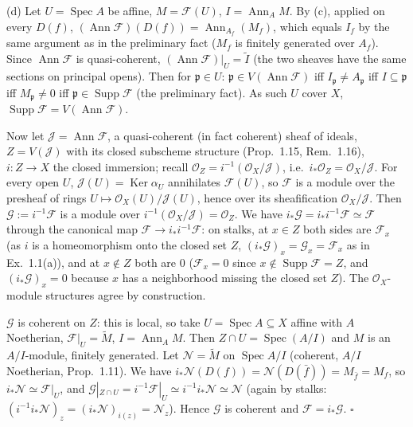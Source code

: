 \documentclass[11pt]{article}
\begin{document}
(d) Let $U=\operatorname{Spec}A$ be affine, $M=\mathcal{F}(U)$, $I=\operatorname{Ann}_AM$. By (c), applied on every $D(f)$, $(\operatorname{Ann}\mathcal{F})(D(f))=\operatorname{Ann}_{A_f}(M_f)$, which equals $I_f$ by the same argument as in the preliminary fact ($M_f$ is finitely generated over $A_f$). Since $\operatorname{Ann}\mathcal{F}$ is quasi-coherent, $(\operatorname{Ann}\mathcal{F})|_U=\widetilde I$ (the two sheaves have the same sections on principal opens). Then for $\mathfrak{p}\in U$: $\mathfrak{p}\in V(\operatorname{Ann}\mathcal{F})$ iff $I_\mathfrak{p}\neq A_\mathfrak{p}$ iff $I\subseteq\mathfrak{p}$ iff $M_\mathfrak{p}\neq0$ iff $\mathfrak{p}\in\operatorname{Supp}\mathcal{F}$ (the preliminary fact). As such $U$ cover $X$, $\operatorname{Supp}\mathcal{F}=V(\operatorname{Ann}\mathcal{F})$.

Now let $\mathcal{J}=\operatorname{Ann}\mathcal{F}$, a quasi-coherent (in fact coherent) sheaf of ideals, $Z=V(\mathcal{J})$ with its closed subscheme structure (Prop.~1.15, Rem.~1.16), $i:Z\to X$ the closed immersion; recall $\mathcal{O}_Z=i^{-1}(\mathcal{O}_X/\mathcal{J})$, i.e.\ $i_*\mathcal{O}_Z=\mathcal{O}_X/\mathcal{J}$. For every open $U$, $\mathcal{J}(U)=\operatorname{Ker}\alpha_U$ annihilates $\mathcal{F}(U)$, so $\mathcal{F}$ is a module over the presheaf of rings $U\mapsto\mathcal{O}_X(U)/\mathcal{J}(U)$, hence over its sheafification $\mathcal{O}_X/\mathcal{J}$. Then $\mathcal{G}:=i^{-1}\mathcal{F}$ is a module over $i^{-1}(\mathcal{O}_X/\mathcal{J})=\mathcal{O}_Z$. We have $i_*\mathcal{G}=i_*i^{-1}\mathcal{F}\simeq\mathcal{F}$ through the canonical map $\mathcal{F}\to i_*i^{-1}\mathcal{F}$: on stalks, at $x\in Z$ both sides are $\mathcal{F}_x$ (as $i$ is a homeomorphism onto the closed set $Z$, $(i_*\mathcal{G})_x=\mathcal{G}_x=\mathcal{F}_x$ as in Ex.~1.1(a)), and at $x\notin Z$ both are $0$ ($\mathcal{F}_x=0$ since $x\notin\operatorname{Supp}\mathcal{F}=Z$, and $(i_*\mathcal{G})_x=0$ because $x$ has a neighborhood missing the closed set $Z$). The $\mathcal{O}_X$-module structures agree by construction.

$\mathcal{G}$ is coherent on $Z$: this is local, so take $U=\operatorname{Spec}A\subseteq X$ affine with $A$ Noetherian, $\mathcal{F}|_U=\widetilde M$, $I=\operatorname{Ann}_AM$. Then $Z\cap U=\operatorname{Spec}(A/I)$ and $M$ is an $A/I$-module, finitely generated. Let $\mathcal{N}=\widetilde M$ on $\operatorname{Spec}A/I$ (coherent, $A/I$ Noetherian, Prop.~1.11). We have $i_*\mathcal{N}(D(f))=\mathcal{N}(D(\bar f))=M_{\bar f}=M_f$, so $i_*\mathcal{N}\simeq\mathcal{F}|_U$, and $\mathcal{G}|_{Z\cap U}=i^{-1}\mathcal{F}|_U\simeq i^{-1}i_*\mathcal{N}\simeq\mathcal{N}$ (again by stalks: $(i^{-1}i_*\mathcal{N})_z=(i_*\mathcal{N})_{i(z)}=\mathcal{N}_z$). Hence $\mathcal{G}$ is coherent and $\mathcal{F}=i_*\mathcal{G}$. \hfill$\square$
\end{document}
